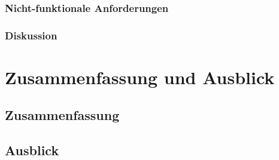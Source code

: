 \documentclass[11pt,a4paper]{scrartcl}
\begin{document}
\subsubsection{Nicht-funktionale Anforderungen}\label{subsubsec:non-functional-requirements}
\subsubsection{Diskussion}\label{subsubsec:anforderungsanalyse-discussion}

\section{Zusammenfassung und Ausblick}\label{sec:summary}
\subsection{Zusammenfassung}\label{subsec:summary}
\subsection{Ausblick}\label{subsec:outlook}

\newpage

\printbibliography{}
\listoffigures
\end{document}
